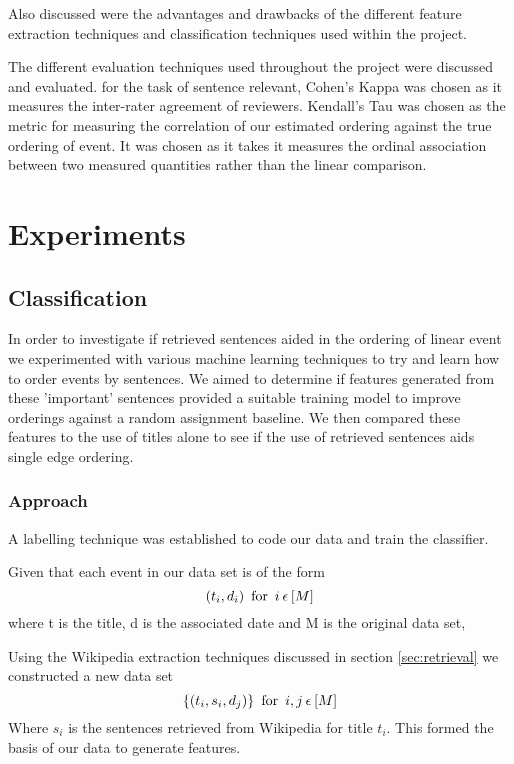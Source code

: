 \documentclass[bsc,frontabs,twoside,singlespacing,parskip,deptreport]{infthesis}     %
\begin{document}
Also discussed were the advantages and  drawbacks of the different feature extraction techniques and classification
techniques used within the project.

The different evaluation techniques used throughout the project were discussed and evaluated. 
for the task of sentence relevant, Cohen's Kappa \cite{wood2007understanding} was chosen as it measures the inter-rater agreement of
reviewers. Kendall's Tau \cite{abdi2007kendall} was chosen as the metric for measuring the correlation of our estimated ordering
against the true ordering of event. It was chosen as it takes it measures the ordinal association between two
measured quantities rather than the linear comparison.


\chapter{Experiments}
\section{Classification}
In order to investigate if retrieved sentences aided in the  ordering of linear event we experimented with various
machine learning techniques to try and learn how to order events by sentences.
We aimed to determine if features generated from these 'important' sentences provided a suitable training model
to improve orderings against a random assignment baseline. We then compared these features to the use of titles alone
to see if the use of retrieved sentences aids single edge ordering.


\subsection{Approach}
A labelling technique was established to code our data and train the classifier.


 Given that each event in our data set is of the form
  \begin{equation}
  (t_{i},d_{i}) \hspace{0.5em} \text{for} \hspace{0.5em} i \hspace{0.2em}\epsilon \hspace{0.2em} [M]\nonumber
    \end{equation}
    where t is the title, d is the associated date and M is the original data set,

    Using the Wikipedia extraction techniques discussed in section \ref{sec:retrieval} we constructed a new data set
    \begin{equation}
      \{(t_{i},s_{i},d_{j})\} \hspace{0.5em} \text{for} \hspace{0.5em}i,j  \hspace{0.2em}\epsilon \hspace{0.2em}[M]\nonumber
    \end{equation}
    Where $s_i$ is the sentences retrieved from Wikipedia for title $t_i$. 
    This formed the basis of our data to generate features.
\end{document}
